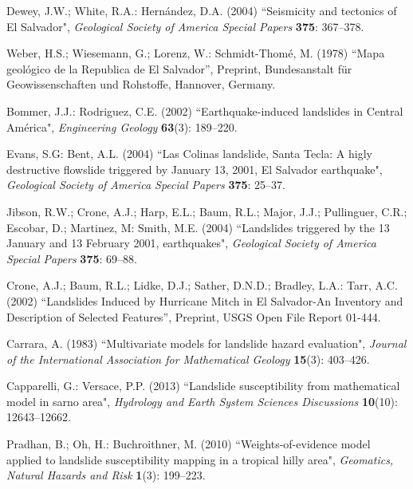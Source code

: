 \documentclass[11pt,twoside]{rmta2010eng}%
\begin{document}
\begin{thebibliography}{99}



Dewey, J.W.; White, R.A.: Hern\'{a}ndez, D.A. (2004)
``Seismicity and tectonics of El Salvador",
{\it Geological Society of America Special Papers} {\bf 375}: 367--378.


Weber, H.S.; Wiesemann, G.; Lorenz, W.: Schmidt-Thom\'{e}, M. (1978)
``Mapa geol\'{o}gico de la Republica de El Salvador'',
Preprint, Bundesanstalt f\"ur Geowissenschaften und Rohstoffe, Hannover, Germany.


Bommer, J.J.: Rodriguez, C.E. (2002)
``Earthquake-induced landslides in Central Am\'{e}rica", 
{\it Engineering Geology} {\bf 63}(3): 189--220.


Evans, S.G: Bent, A.L. (2004) 
``Las Colinas landslide, Santa Tecla:  A higly destructive flowslide triggered by January 13, 2001, El Salvador earthquake", 
{\it Geological Society of America Special Papers} {\bf 375}: 25--37.


Jibson, R.W.; Crone, A.J.; Harp, E.L.; Baum, R.L.; Major, J.J.; Pullinguer, C.R.; Escobar, D.; Martinez, M: Smith, M.E. (2004) 
``Landslides triggered by the 13 January and 13 February 2001, earthquakes", 
{\it Geological Society of America Special Papers} {\bf 375}: 69--88.


Crone, A.J.; Baum, R.L.; Lidke, D.J.; Sather, D.N.D.; Bradley, L.A.: Tarr, A.C. (2002)
``Landslides Induced by Hurricane Mitch in El Salvador-An Inventory and Description of Selected Features'',
Preprint, USGS Open File Report 01-444.



Carrara, A. (1983) 
``Multivariate models for landslide hazard evaluation", 
{\it Journal of the International Association for Mathematical
  Geology} {\bf 15}(3): 403--426.



Capparelli, G.: Versace, P.P. (2013)
``Landslide susceptibility from mathematical model in sarno area", 
{\it Hydrology and Earth System Sciences Discussions} {\bf 10}(10): 12643--12662.


Pradhan, B.; Oh, H.: Buchroithner, M. (2010)
``Weights-of-evidence model applied to landslide susceptibility mapping
  in a tropical hilly area", 
{\it Geomatics, Natural Hazards and Risk} {\bf 1}(3): 199--223.
  

\end{thebibliography}
\end{document}
